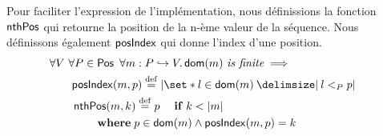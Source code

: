 Pour faciliter l'expression de l'implémentation, nous définissions la fonction $\operatorname{\mathsf{nthPos}}$ qui retourne la position de la n-ème valeur de la séquence.
Nous définissons également $\operatorname{\mathsf{posIndex}}$ qui donne l'index d'une position.
%
\begin{equation}\begin{split}
\MoveEqLeft \forall V \ \forall P \in \trm{Pos} \ \forall m: P \pto V \qsep \trm{dom}(m)\ \textit{is finite} \implies\\
%
&\begin{aligned}
\trm{posIndex}&(m, p) \defeq%
\card*{\set*{l \in \trm{dom}(m) \given l <_P p}}
\end{aligned}\\
%
&\begin{aligned}
\MoveEqLeft \trm{nthPos}(m, k) \defeq p \quad\when k < \card*{m}\\
&\where p \in \trm{dom}(m) \land \trm{posIndex}(m, p) = k
\end{aligned}
%
\end{split}\end{equation}

